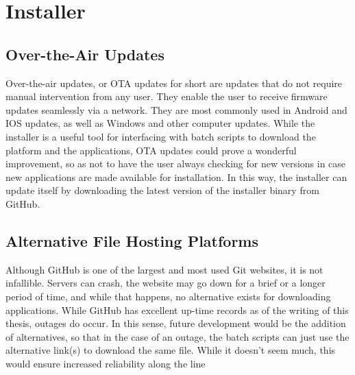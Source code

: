 \section{Installer}
\subsection{Over-the-Air Updates}
Over-the-air updates, or OTA updates for short are updates that do not require manual intervention from any user. They enable the user to receive firmware updates seamlessly via a network. They are most commonly used in Android and IOS updates, as well as Windows and other computer updates.
\vspace{\baselineskip}\newline
While the installer is a useful tool for interfacing with batch scripts to download the platform and the applications, OTA updates could prove a wonderful improvement, so as not to have the user always checking for new versions in case new applications are made available for installation. In this way, the installer can update itself by downloading the latest version of the installer binary from GitHub.

\subsection{Alternative File Hosting Platforms}
Although GitHub is one of the largest and most used Git websites, it is not infallible. Servers can crash, the website may go down for a brief or a longer period of time, and while that happens, no alternative exists for downloading applications. While GitHub has excellent up-time records as of the writing of this thesis, outages do occur. In this sense, future development would be the addition of alternatives, so that in the case of an outage, the batch scripts can just use the alternative link(s) to download the same file. While it doesn't seem much, this would ensure increased reliability along the line 
